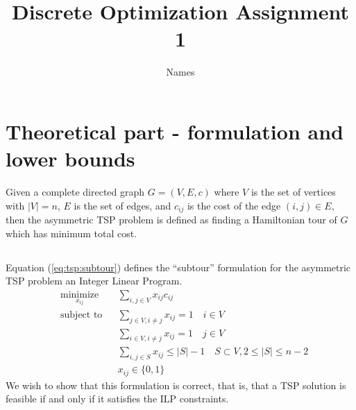\documentclass[11pt,a4paper,english]{article}
\begin{document}
\title{Discrete Optimization Assignment 1}
\author{Names}
\maketitle
\tableofcontents
\clearpage

\section{Theoretical part - formulation and lower bounds}
Given a complete directed graph $G = (V, E, c)$ where $V$ is the set of vertices with
$|V| = n$, $E$ is the set of edges, and $c_{ij}$ is the cost
of the edge $(i,j) \in E$, then the asymmetric TSP problem is defined as finding a
 Hamiltonian tour of $G$ which has minimum total cost.
 \subsection{}
 Equation (\ref{eq:tsp:subtour}) defines the  ``subtour''  formulation
  for the asymmetric TSP problem  an Integer
  Linear Program.
 \begin{equation}
   \label{eq:tsp:subtour}
   \begin{aligned}
     & \underset{x_{ij}}{\text{minimize}}
     & & \sum_{i,j \in V} x_{ij}c_{ij} \\
     & \text{subject to}
     & & \sum_{j \in V, i \neq j} x_{ij} = 1 \quad i \in V \\
     & & & \sum_{i \in V, i \neq j} x_{ij} = 1 \quad j \in V \\
     & & & \sum_{i,j \in S} x_{ij} \leq |S| - 1 \quad S \subset V, 2 \leq |S| \leq n-2 \\
     & & & x_{ij} \in \{0,1\}
   \end{aligned}
 \end{equation}
 We wish to show that this formulation is correct, that is, that a TSP solution is feasible if and only if it satisfies the ILP constraints.
\end{document}
